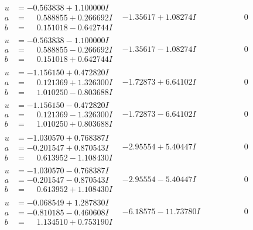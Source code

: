 \documentclass[1p]{elsarticle_modified}
\theoremstyle{definition}
\begin{document}
$$\begin{array}{c|c|c}
\begin{aligned}
u &= -0.563838 + 1.100000 I \\
a &= \phantom{-}0.588855 + 0.266692 I \\
b &= \phantom{-}0.151018 - 0.642744 I\end{aligned}
 & -1.35617 + 1.08274 I & \phantom{-0.000000 } 0 \\ \hline\begin{aligned}
u &= -0.563838 - 1.100000 I \\
a &= \phantom{-}0.588855 - 0.266692 I \\
b &= \phantom{-}0.151018 + 0.642744 I\end{aligned}
 & -1.35617 - 1.08274 I & \phantom{-0.000000 } 0 \\ \hline\begin{aligned}
u &= -1.156150 + 0.472820 I \\
a &= \phantom{-}0.121369 + 1.326300 I \\
b &= \phantom{-}1.010250 - 0.803688 I\end{aligned}
 & -1.72873 + 6.64102 I & \phantom{-0.000000 } 0 \\ \hline\begin{aligned}
u &= -1.156150 - 0.472820 I \\
a &= \phantom{-}0.121369 - 1.326300 I \\
b &= \phantom{-}1.010250 + 0.803688 I\end{aligned}
 & -1.72873 - 6.64102 I & \phantom{-0.000000 } 0 \\ \hline\begin{aligned}
u &= -1.030570 + 0.768387 I \\
a &= -0.201547 + 0.870543 I \\
b &= \phantom{-}0.613952 - 1.108430 I\end{aligned}
 & -2.95554 + 5.40447 I & \phantom{-0.000000 } 0 \\ \hline\begin{aligned}
u &= -1.030570 - 0.768387 I \\
a &= -0.201547 - 0.870543 I \\
b &= \phantom{-}0.613952 + 1.108430 I\end{aligned}
 & -2.95554 - 5.40447 I & \phantom{-0.000000 } 0 \\ \hline\begin{aligned}
u &= -0.068549 + 1.287830 I \\
a &= -0.810185 - 0.460608 I \\
b &= \phantom{-}1.134510 + 0.753190 I\end{aligned}
 & -6.18575 - 11.73780 I & \phantom{-0.000000 } 0 \\ \hline\begin{aligned}

\end{aligned}
\end{array}$$
\end{document}
